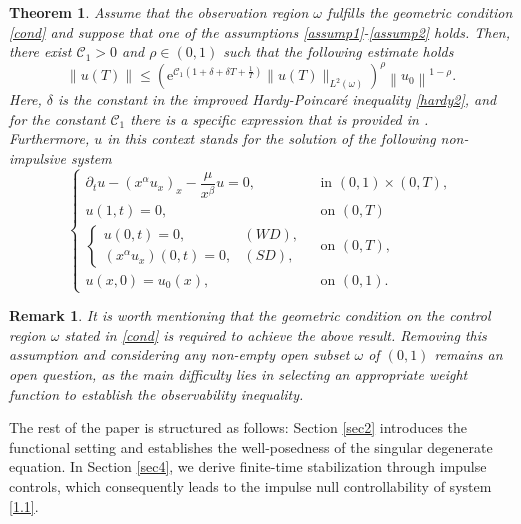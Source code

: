 \documentclass[sn-mathphys]{sn-jnl}
\newtheorem{theorem}{Theorem}[section]
\newtheorem{remark}{Remark}
\begin{document}
\begin{theorem}\label{theo1.1}
Assume that the observation region $\omega$ fulfills the geometric condition \eqref{cond} and suppose that one of the assumptions \eqref{assump1}-\eqref{assump2} holds. Then, there exist $\mathcal{C}_{1} >0$ and $\rho \in (0,1)$ such that the following estimate holds 
    \begin{equation}
        \|u(T)\| \leq\left( \mathrm{e}^{\mathcal{C}_1\left(1+ \delta + \delta T +\frac{1}{T} \right)}\|u( T)\|_{L^2(\omega)}\right)^\rho\left\|u_0\right\|^{1-\rho}.
    \end{equation}
Here, $\delta$ is the constant in the improved Hardy-Poincar\'e inequality \eqref{hardy2}, and for the constant $\mathcal{C}_1$ there is a specific expression that is provided in \citep{MMOS}. Furthermore, $u$ in this context stands for the solution of the following non-impulsive system
    \begin{equation}\label{1.2}
    \begin{cases}
        \partial_t u-\left(x^\alpha u_x\right)_x-\dfrac{\mu}{x^\beta} u=0, & \text { in }(0,1) \times(0, T) , \\ 
        u(1, t)=0,  & \text { on }(0, T)\\
        \left\{\begin{array}{ll}
        u(0, t)=0, & (W D), \\
        \left(x^\alpha u_x\right)(0, t)=0, & (S D),
        \end{array} \right. &\text { on }(0, T),\\
        u(x, 0)=u_0(x), & \text { on }(0,1).
    \end{cases}
    \end{equation}
\end{theorem}
\begin{remark}
    It is worth mentioning that the geometric condition on the control region \( \omega \) stated in \eqref{cond} is required to achieve the above result. Removing this assumption and considering any non-empty open subset \( \omega \) of \( (0,1) \) remains an open question, as the main difficulty lies in selecting an appropriate weight function to establish the observability inequality.
\end{remark}
The rest of the paper is structured as follows: Section \ref{sec2} introduces the functional setting and establishes the well-posedness of the singular degenerate equation. In Section \ref{sec4}, we derive finite-time stabilization through impulse controls, which consequently leads to the impulse null controllability of system \eqref{1.1}.
\end{document}

